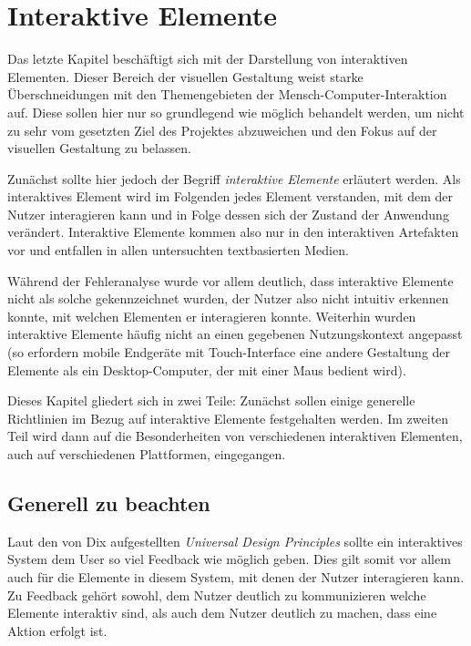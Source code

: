 
\chapter{Interaktive Elemente} %

\label{Interaktive-Elemente} %



Das letzte Kapitel beschäftigt sich mit der Darstellung von interaktiven Elementen. Dieser Bereich der visuellen Gestaltung weist starke Überschneidungen mit den Themengebieten der Mensch-Computer-Interaktion auf. Diese sollen hier nur so grundlegend wie möglich behandelt werden, um nicht zu sehr vom gesetzten Ziel des Projektes abzuweichen und den Fokus auf der visuellen Gestaltung zu belassen.

Zunächst sollte hier jedoch der Begriff \textit{interaktive Elemente} erläutert werden. Als interaktives Element wird im Folgenden jedes Element verstanden, mit dem der Nutzer interagieren kann und in Folge dessen sich der Zustand der Anwendung verändert. Interaktive Elemente kommen also nur in den interaktiven Artefakten vor und entfallen in allen untersuchten textbasierten Medien.

Während der Fehleranalyse wurde vor allem deutlich, dass interaktive Elemente nicht als solche gekennzeichnet wurden, der Nutzer also nicht intuitiv erkennen konnte, mit welchen Elementen er interagieren konnte. Weiterhin wurden interaktive Elemente häufig nicht an einen gegebenen Nutzungskontext angepasst (so erfordern mobile Endgeräte mit Touch-Interface eine andere Gestaltung der Elemente als ein Desktop-Computer, der mit einer Maus bedient wird).

Dieses Kapitel gliedert sich in zwei Teile: Zunächst sollen einige generelle Richtlinien im Bezug auf interaktive Elemente festgehalten werden. Im zweiten Teil wird dann auf die Besonderheiten von verschiedenen interaktiven Elementen, auch auf verschiedenen Plattformen, eingegangen.

\section{Generell zu beachten}
Laut den von Dix aufgestellten \textit{Universal Design Principles} \cite[S.367]{dix2009human} sollte ein interaktives System dem User so viel Feedback wie möglich geben. Dies gilt somit vor allem auch für die Elemente in diesem System, mit denen der Nutzer interagieren kann.
Zu Feedback gehört sowohl, dem Nutzer deutlich zu kommunizieren welche Elemente interaktiv sind, als auch dem Nutzer deutlich zu machen, dass eine Aktion erfolgt ist.

